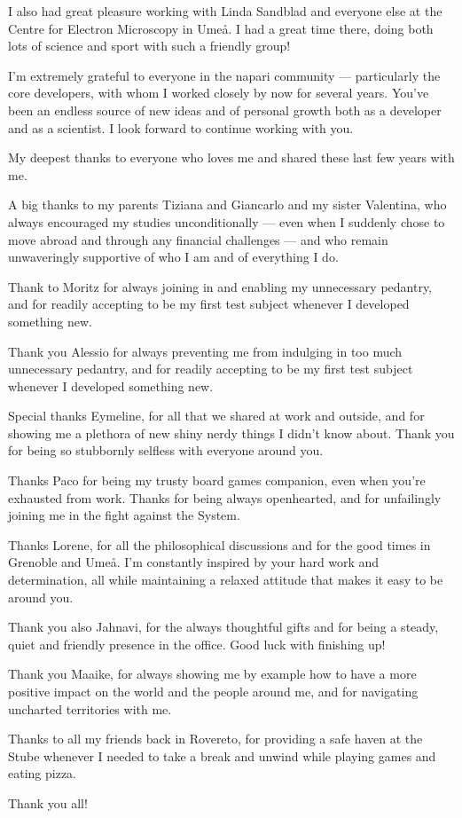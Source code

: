 I also had great pleasure working with Linda Sandblad and everyone else at the Centre for Electron Microscopy in Umeå. I had a great time there, doing both lots of science and sport with such a friendly group!

I'm extremely grateful to everyone in the napari community --- particularly the core developers, with whom I worked closely by now for several years. You've been an endless source of new ideas and of personal growth both as a developer and as a scientist. I look forward to continue working with you.

\bigskip

My deepest thanks to everyone who loves me and shared these last few years with me.

A big thanks to my parents Tiziana and Giancarlo and my sister Valentina, who always encouraged my studies unconditionally --- even when I suddenly chose to move abroad and through any financial challenges --- and who remain unwaveringly supportive of who I am and of everything I do.

Thank to Moritz for always joining in and enabling my unnecessary pedantry, and for readily accepting to be my first test subject whenever I developed something new.

Thank you Alessio for always preventing me from indulging in too much unnecessary pedantry, and for readily accepting to be my first test subject whenever I developed something new.

Special thanks Eymeline, for all that we shared at work and outside, and for showing me a plethora of new shiny nerdy things I didn't know about. Thank you for being so stubbornly selfless with everyone around you.

Thanks Paco for being my trusty board games companion, even when you're exhausted from work. Thanks for being always openhearted, and for unfailingly joining me in the fight against the System. 

Thanks Lorene, for all the philosophical discussions and for the good times in Grenoble and Umeå. I'm constantly inspired by your hard work and determination, all while maintaining a relaxed attitude that makes it easy to be around you.

Thank you also Jahnavi, for the always thoughtful gifts and for being a steady, quiet and friendly presence in the office. Good luck with finishing up!

Thank you Maaike, for always showing me by example how to have a more positive impact on the world and the people around me, and for navigating uncharted territories with me.

Thanks to all my friends back in Rovereto, for providing a safe haven at the Stube whenever I needed to take a break and unwind while playing games and eating pizza.

\bigskip

Thank you all!
